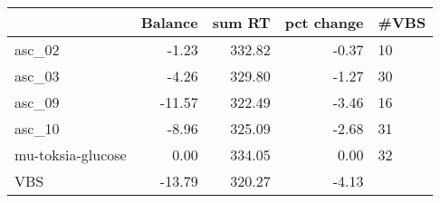 \begin{tabular}{lrrrl}
\toprule
{} &  Balance &  sum RT &  pct change & \#VBS \\
\midrule
asc\_02            &    -1.23 &  332.82 &       -0.37 &   10 \\
asc\_03            &    -4.26 &  329.80 &       -1.27 &   30 \\
asc\_09            &   -11.57 &  322.49 &       -3.46 &   16 \\
asc\_10            &    -8.96 &  325.09 &       -2.68 &   31 \\
mu-toksia-glucose &     0.00 &  334.05 &        0.00 &   32 \\
VBS               &   -13.79 &  320.27 &       -4.13 &      \\
\bottomrule
\end{tabular}
